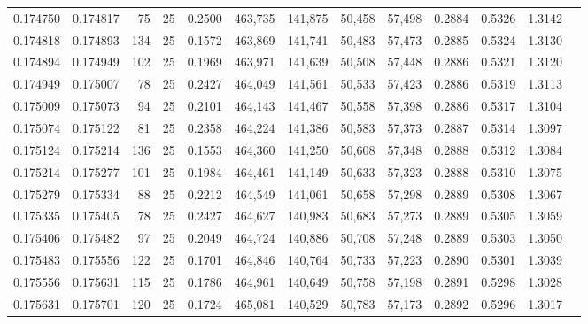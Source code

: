 \begin{tabular}{rrrrrrrrrrrrr}
0.174750 & 0.174817 &    75 &  25 &                                     0.2500 & 463,735 & 141,875 &  50,458 &  57,498 & 0.2884 & 0.5326 & 1.3142 \\
0.174818 & 0.174893 &   134 &  25 &                                     0.1572 & 463,869 & 141,741 &  50,483 &  57,473 & 0.2885 & 0.5324 & 1.3130 \\
0.174894 & 0.174949 &   102 &  25 &                                     0.1969 & 463,971 & 141,639 &  50,508 &  57,448 & 0.2886 & 0.5321 & 1.3120 \\
0.174949 & 0.175007 &    78 &  25 &                                     0.2427 & 464,049 & 141,561 &  50,533 &  57,423 & 0.2886 & 0.5319 & 1.3113 \\
0.175009 & 0.175073 &    94 &  25 &                                     0.2101 & 464,143 & 141,467 &  50,558 &  57,398 & 0.2886 & 0.5317 & 1.3104 \\
0.175074 & 0.175122 &    81 &  25 &                                     0.2358 & 464,224 & 141,386 &  50,583 &  57,373 & 0.2887 & 0.5314 & 1.3097 \\
0.175124 & 0.175214 &   136 &  25 &                                     0.1553 & 464,360 & 141,250 &  50,608 &  57,348 & 0.2888 & 0.5312 & 1.3084 \\
0.175214 & 0.175277 &   101 &  25 &                                     0.1984 & 464,461 & 141,149 &  50,633 &  57,323 & 0.2888 & 0.5310 & 1.3075 \\
0.175279 & 0.175334 &    88 &  25 &                                     0.2212 & 464,549 & 141,061 &  50,658 &  57,298 & 0.2889 & 0.5308 & 1.3067 \\
0.175335 & 0.175405 &    78 &  25 &                                     0.2427 & 464,627 & 140,983 &  50,683 &  57,273 & 0.2889 & 0.5305 & 1.3059 \\
0.175406 & 0.175482 &    97 &  25 &                                     0.2049 & 464,724 & 140,886 &  50,708 &  57,248 & 0.2889 & 0.5303 & 1.3050 \\
0.175483 & 0.175556 &   122 &  25 &                                     0.1701 & 464,846 & 140,764 &  50,733 &  57,223 & 0.2890 & 0.5301 & 1.3039 \\
0.175556 & 0.175631 &   115 &  25 &                                     0.1786 & 464,961 & 140,649 &  50,758 &  57,198 & 0.2891 & 0.5298 & 1.3028 \\
0.175631 & 0.175701 &   120 &  25 &                                     0.1724 & 465,081 & 140,529 &  50,783 &  57,173 & 0.2892 & 0.5296 & 1.3017 \\

\end{tabular}
